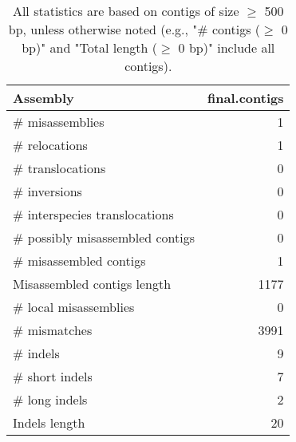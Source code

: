 \documentclass[12pt,a4paper]{article}
\begin{document}
\begin{table}[ht]
\begin{center}
\caption{All statistics are based on contigs of size $\geq$ 500 bp, unless otherwise noted (e.g., "\# contigs ($\geq$ 0 bp)" and "Total length ($\geq$ 0 bp)" include all contigs).}
\begin{tabular}{|l*{1}{|r}|}
\hline
Assembly & final.contigs \\ \hline
\# misassemblies & 1 \\ \hline
\hspace{5mm}\# relocations & 1 \\ \hline
\hspace{5mm}\# translocations & 0 \\ \hline
\hspace{5mm}\# inversions & 0 \\ \hline
\hspace{5mm}\# interspecies translocations & 0 \\ \hline
\# possibly misassembled contigs & 0 \\ \hline
\# misassembled contigs & 1 \\ \hline
Misassembled contigs length & 1177 \\ \hline
\# local misassemblies & 0 \\ \hline
\# mismatches & 3991 \\ \hline
\# indels & 9 \\ \hline
\hspace{5mm}\# short indels & 7 \\ \hline
\hspace{5mm}\# long indels & 2 \\ \hline
Indels length & 20 \\ \hline
\end{tabular}
\end{center}
\end{table}
\end{document}
